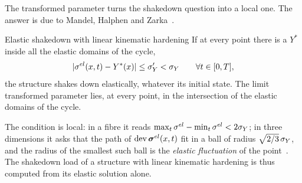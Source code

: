 The transformed parameter turns the shakedown question into a local one. The
answer is due to Mandel, Halphen and Zarka~\cite{MandelHalphenZarka1977}.
\begin{gbox}{Elastic shakedown with linear kinematic hardening}\label{thm:cy-zarka}
If at every point there is a $Y^\ast$ inside all the elastic domains of the
cycle,
\[
  |\sigma^{el}(x,t)-Y^\ast(x)|\le\sigma_{Y}'<\sigma_{Y}\qquad\forall t\in[0,T],
\]
the structure shakes down elastically, whatever its initial state. The
limit transformed parameter lies, at every point, in the intersection of the
elastic domains of the cycle.
\end{gbox}
The condition is local: in a fibre it reads
$\max_t\sigma^{el}-\min_t\sigma^{el}<2\sigma_{Y}$; in three dimensions it asks that
the path of $\operatorname{dev}\bm{\sigma}^{el}(x,t)$ fit in a ball of radius
$\sqrt{2/3}\,\sigma_{Y}$, and the radius of the smallest such ball is the
\emph{elastic fluctuation} of the point~\cite[Sec.~4.4.3]{Maitournam2012c}.
The shakedown load of a structure with linear kinematic hardening is thus
computed from its elastic solution alone.


